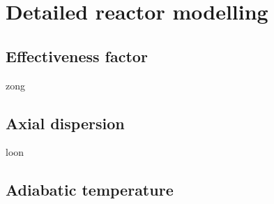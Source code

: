 \section{Detailed reactor modelling}
\subsection{Effectiveness factor}
zong
\subsection{Axial dispersion}
loon
\subsection{Adiabatic temperature}
